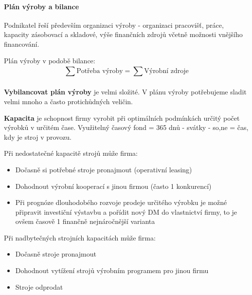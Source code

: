 \documentclass[11pt,a4paper,twoside]{book}
\begin{document}
	\paragraph*{Plán výroby a bilance}
	Podnikatel řeší především organizaci výroby - organizaci pracovišť, práce, kapacity zásobovací a skladové, výše finančních zdrojů včetně možnosti vnějšího financování.

	Plán výroby v podobě bilance:
	\begin{displaymath}
		\sum_{}^{} \text{Potřeba výroby} = \sum_{}^{} \text{Výrobní zdroje}
	\end{displaymath}

	\textbf{Vybilancovat plán výroby} je velmi složité. V plánu výroby potřebujeme sladit velmi mnoho a často protichůdných veličin.

	\textbf{Kapacita} je schopnost firmy vyrobit při optimálních podmínkách určitý počet výrobků v určitém čase. Využitelný časový fond = 365 dnů - svátky - so,ne = čas, kdy je stroj v provozu.
	
	Při nedostatečné kapacitě strojů může firma:
	\begin{itemize}
		\item Dočasně si potřebné stroje pronajmout (operativní leasing)
		\item Dohodnout výrobní kooperací s jinou firmou (často 1 konkurencí)
		\item Při prognóze dlouhodobého rozvoje prodeje určitého výrobku je možné připravit investiční výstavbu a pořídit nový DM do vlastnictví firmy, to je ovšem časově 1 finančně nejnáročnější varianta
	\end{itemize}

	Při nadbytečných strojních kapacitách může firma:
	\begin{itemize}
		\item Dočasně stroje pronajmout
		\item Dohodnout vytížení strojů výrobním programem pro jinou firmu
		\item Stroje odprodat
	\end{itemize}
\end{document}
